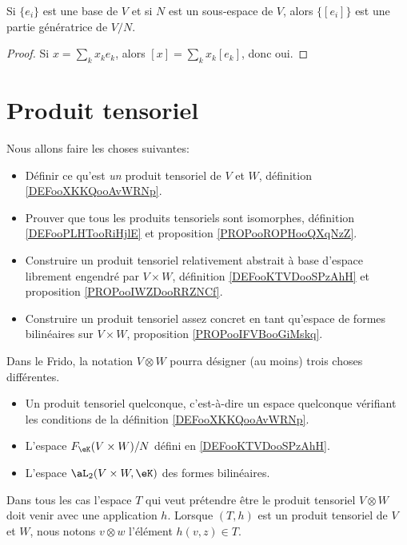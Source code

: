 \begin{proposition}
	Si \( \{ e_i \}\) est une base de \( V\) et si \( N\) est un sous-espace de \( V\), alors \( \{ [e_i] \}\) est une partie génératrice de \( V/N\).
\end{proposition}

\begin{proof}
	Si \( x=\sum_kx_ke_k\), alors \( [x]=\sum_kx_k[e_k]\), donc oui.
\end{proof}

\section{Produit tensoriel}

Nous allons faire les choses suivantes:
\begin{itemize}
	\item
	      Définir ce qu'est \emph{un} produit tensoriel de \( V\) et \( W\), définition \ref{DEFooXKKQooAvWRNp}.
	\item
	      Prouver que tous les produits tensoriels sont isomorphes, définition \ref{DEFooPLHTooRiHjlE} et proposition \ref{PROPooROPHooQXqNzZ}.
	\item
	      Construire un produit tensoriel relativement abstrait à base d'espace librement engendré par \( V\times W\), définition \ref{DEFooKTVDooSPzAhH} et proposition \ref{PROPooIWZDooRRZNCf}.
	\item
	      Construire un produit tensoriel assez concret en tant qu'espace de formes bilinéaires sur \( V\times W\), proposition \ref{PROPooIFVBooGiMskq}.
\end{itemize}

\begin{normaltext}
	Dans le Frido, la notation \( V\otimes W\) pourra désigner (au moins) trois choses différentes.
	\begin{itemize}
		\item
		      Un produit tensoriel quelconque, c'est-à-dire un espace quelconque vérifiant les conditions de la définition \ref{DEFooXKKQooAvWRNp}.
		\item
		      L'espace $F_{\eK}(V\times W)/N$ défini en \ref{DEFooKTVDooSPzAhH}.
		\item
		      L'espace \( \aL_2(V\times W,\eK)\) des formes bilinéaires.
	\end{itemize}
	Dans tous les cas l'espace \( T\) qui veut prétendre être le produit tensoriel \( V\otimes W\) doit venir avec une application \( h\). Lorsque \( (T,h)\) est un produit tensoriel de \( V\) et \( W\), nous notons \( v\otimes w\) l'élément \( h(v,z)\in T\).
\end{normaltext}

